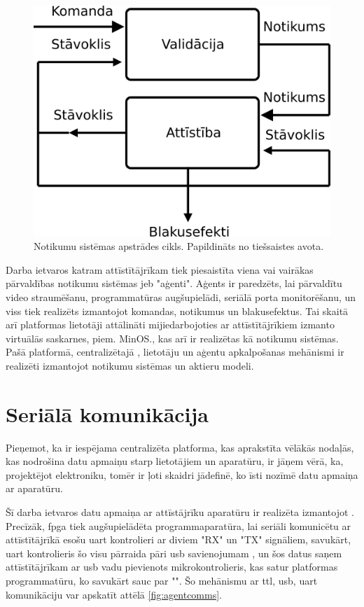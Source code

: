 \begin{figure}[H]
    \includegraphics[width=0.5\linewidth]{assets/event-sourcing-decider.png}
    \centering
    \caption{Notikumu sistēmas apstrādes cikls. Papildināts no tiešsaistes avota. \cite{JeremieChassaing2021}}
    \label{fig:eventengine}
\end{figure}

Darba ietvaros katram attīstītājrīkam tiek piesaistīta viena vai vairākas
pārvaldības notikumu sistēmas jeb "aģenti". Aģents ir paredzēts, lai pārvaldītu
video straumēšanu, programmatūras augšupielādi, seriālā porta monitorēšanu, un
viss tiek realizēts izmantojot komandas, notikumus un blakusefektus. Tai skaitā
arī platformas lietotāji attālināti mijiedarbojoties ar attīstītājrīkiem izmanto
virtuālās saskarnes, piem. MinOS., kas arī ir realizētas kā notikumu sistēmas.
Pašā platformā, centralizētajā , lietotāju un aģentu
apkalpošanas mehānismi ir realizēti izmantojot notikumu sistēmas un aktieru
modeli. 

\section{Seriālā komunikācija}
\label{sec:serial}

Pieņemot, ka ir iespējama centralizēta platforma, kas aprakstīta vēlākās
nodaļās, kas nodrošina datu apmaiņu starp lietotājiem un aparatūru, ir jāņem
vērā, ka, projektējot elektroniku, tomēr ir ļoti skaidri jādefinē, ko īsti
nozīmē datu apmaiņa ar aparatūru.

Šī darba ietvaros datu apmaiņa ar attīstājrīku aparatūru ir realizēta izmantojot
. Precīzāk, \gls{fpga} tiek
augšupielādēta programmaparatūra, lai seriāli komunicētu ar attīstītājrīkā esošu
\gls{uart} kontrolieri ar diviem "RX" un "TX" signāliem, savukārt,
\gls{uart} kontrolieris šo visu pārraida pāri \gls{usb} savienojumam
\cite[para. USB-UART Bridge]{DigilentAnvylReference}, un šos datus saņem
attīstītājrīkam ar \gls{usb} vadu pievienots mikrokontrolieris, kas satur
platformas programmatūru, ko savukārt sauc par "". Šo
mehānismu ar \gls{ttl}, \gls{usb}, \gls{uart} komunikāciju var
apskatīt attēlā \ref{fig:agentcomms}.


